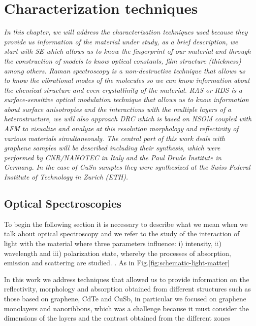 \begin{center}
	
\end{center}\textbf{}\chapter{Characterization techniques }
\label{chap:chap2}
\textit{In this chapter, we will address the characterization techniques used because they provide us information of the material under study, as a brief description, we start with SE which allows us to know the fingerprint of our material and through the construction of models to know optical constants, film structure (thickness) among others. Raman spectroscopy is a non-destructive technique that allows us to know the vibrational modes of the molecules so we can know information about the chemical structure and even crystallinity of the material. RAS or RDS is a surface-sensitive optical modulation technique that allows us to know  information about surface anisotropies and the interactions with the multiple layers of a heterostructure, we will also approach DRC which is based on NSOM coupled with AFM to visualize and analyze at this resolution morphology and reflectivity of various materials simultaneously. The central part of this work deals with graphene samples will be described including their synthesis, which were performed by CNR/NANOTEC in Italy and the Paul Drude Institute in Germany. In the case of CuSn samples they were synthesized at the Swiss Federal Institute of Technology in Zurich (ETH).}
\vfill
\minitoc
\newpage

\allowdisplaybreaks

\section{Optical Spectroscopies}
\vspace{-1.3cm}
To begin the following section it is necessary to describe what we mean when we talk about optical spectroscopy and we refer to the study of the interaction of light with the material where three parameters influence: i) intensity, ii) wavelength and iii) polarization state, whereby the processes of absorption, emission and scattering are studied. \cite{ionita2014condensed}. As in Fig.\ref*{fig:schematic-light-matter}

In this work we address techniques that allowed us to provide information on the reflectivity, morphology and absorption obtained from different structures such as those based on graphene, CdTe and CuSb, in particular we focused on graphene monolayers and nanoribbons, which was a challenge because it must consider the dimensions of the layers and the contrast obtained from the different zones

